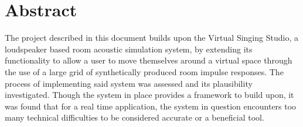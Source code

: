 \documentclass[../../main.tex]{subfiles}
\begin{document}
\clearpage
\thispagestyle{empty}
	
	\section*{Abstract}

		 \vspace{5mm}
		 \begin{center}
		 \begin{minipage}{0.7\textwidth}
		 The project described in this document builds upon the Virtual Singing Studio, a loudspeaker based room acoustic simulation system, by extending its functionality to allow a user to move themselves around a virtual space through the use of a large grid of synthetically produced room impulse responses. The process of implementing said system was assessed and its plausibility investigated. Though the system in place provides a framework to build upon, it was found that for a real time application, the system in question encounters too many technical difficulties to be considered accurate or a beneficial tool.




		 \end{minipage}
		 \end{center}
		 \vspace{5mm}
\end{document}
